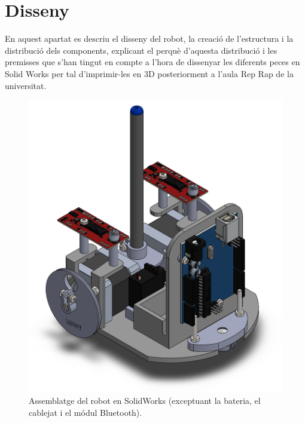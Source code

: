 \setlength\topmargin{8mm}
\onehalfspacing
\chapter{Disseny} %

\label{Chapter3} %


En aquest apartat es descriu el disseny del robot, la creació de l’estructura i la distribució dels components, explicant el perquè d’aquesta distribució i les premisses que s’han tingut en compte a l'hora de dissenyar les diferents peces en Solid Works per tal d'imprimir-les en 3D posteriorment a l'aula Rep Rap de la universitat.   

\begin{figure}[H]
	\centering
	\includegraphics[scale=0.6]{RobotSW.png}
	\caption{Assemblatge del robot en SolidWorks (exceptuant la bateria, el cablejat i el módul Bluetooth).}
	\label{fig:RobotSW}
\end{figure}

